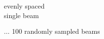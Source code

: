 \documentclass[a4paper,10pt]{article}
\begin{document}
\sffamily 


\begin{center}
evenly spaced\\
\vspace{-1mm}
single beam
\end{center}

\begin{center}
$\ldots$ 100 randomly sampled beams
\end{center}


%
%
\end{document}
